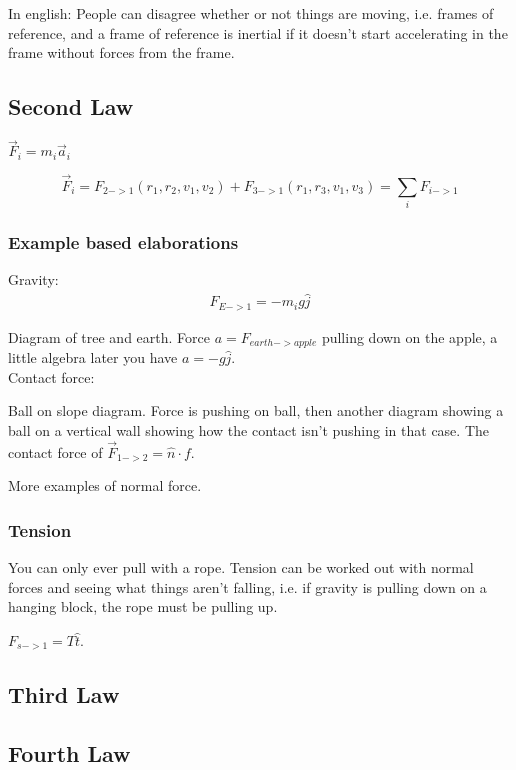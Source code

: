 \documentclass[11pt, notitlepage]{report}
\newcommand{\ora}[1]{\overrightarrow{#1}}
\begin{document}
In english: People can disagree whether or not things are moving, i.e. frames of reference, and a frame of reference is inertial if it doesn't start accelerating in the frame without forces from the frame.

\subsection{Second Law}

$\ora{F}_i=m_i\ora{a}_i$

\[\ora{F}_i= F_{2->1} (r_1,r_2,v_1,v_2) + F_{3->1} (r_1,r_3,v_1,v_3)
= \sum_{i}{F_{i->1}} \]


\subsubsection{Example based elaborations}

Gravity: \begin{align*}
	F_{E->1}=-m_ig\hat{j}
\end{align*}

Diagram of tree and earth. Force $a=F_{earth -> apple}$ pulling down on  the apple, a little algebra later you have $a=-g\hat{j}$.\\

Contact force: 

Ball on slope diagram. Force is pushing on ball, then another diagram showing a ball on a vertical wall showing how the contact isn't pushing in that case. The contact force of $\ora{F}_{1->2} = \hat{n} \cdot f$. 

More examples of normal force.

\subsubsection{Tension}

You can only ever pull with a rope. Tension can be worked out with normal forces and seeing what things aren't falling, i.e. if gravity is pulling down on a hanging block, the rope must be pulling up.

$F_{s->1}=T\hat{t}$.

\subsection{Third Law}
\subsection{Fourth Law}
\end{document}
